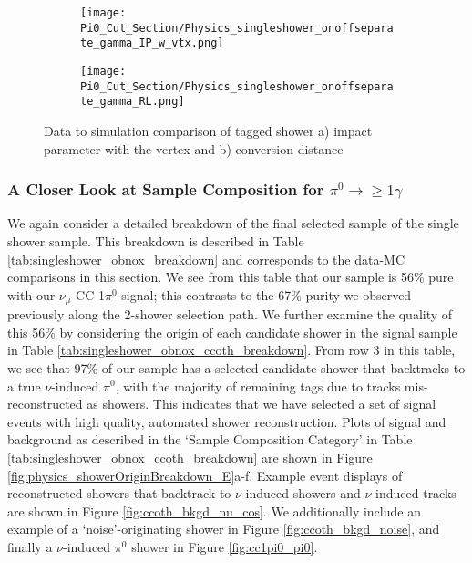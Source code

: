 \begin{figure}[H]
  \begin{subfigure}[t]{0.3\textwidth}
\texttt{[image: Pi0\_Cut\_Section/Physics\_singleshower\_onoffseparate\_gamma\_IP\_w\_vtx.png]}
  \caption{ }
  \end{subfigure} 
  \hspace{20mm}
  \begin{subfigure}[t]{0.3\textwidth}
\texttt{[image: Pi0\_Cut\_Section/Physics\_singleshower\_onoffseparate\_gamma\_RL.png]}
  \caption{ }
  \end{subfigure} 
\caption{ Data to simulation comparison of tagged shower a) impact parameter with the vertex and b) conversion distance }
\label{fig:physics_singleshower_ip}
\end{figure}

\subsubsection{A Closer Look at Sample Composition for $\pi^0\rightarrow\geq 1 \gamma$} 
We again consider a detailed breakdown of the final selected sample of the single shower sample.  This breakdown is described in Table \ref{tab:singleshower_obnox_breakdown} and corresponds to the data-MC comparisons in this section. We see from this table that our sample is 56\% pure with our $\nu_\mu$ CC 1$\pi^0$ signal; this contrasts to the 67\% purity we observed previously along the 2-shower selection path.  We further examine the quality of this 56\% by considering the origin of each candidate shower in the signal sample in Table \ref{tab:singleshower_obnox_ccoth_breakdown}.  From row 3 in this table, we see that 97\% of our sample has a selected candidate shower that backtracks to a true $\nu$-induced $\pi^0$, with the majority of remaining tags due to tracks mis-reconstructed as showers. This indicates that we have selected a set of signal events with high quality, automated shower reconstruction.  Plots of signal and background as described in the `Sample Composition Category' in Table \ref{tab:singleshower_obnox_ccoth_breakdown} are shown in Figure \ref{fig:physics_showerOriginBreakdown_E}a-f. Example event displays of reconstructed showers that backtrack to $\nu$-induced showers and $\nu$-induced tracks are shown in Figure \ref{fig:ccoth_bkgd_nu_cos}.  We additionally include an example of a `noise'-originating shower in Figure \ref{fig:ccoth_bkgd_noise}, and finally a $\nu$-induced $\pi^0$ shower in Figure \ref{fig:cc1pi0_pi0}.


